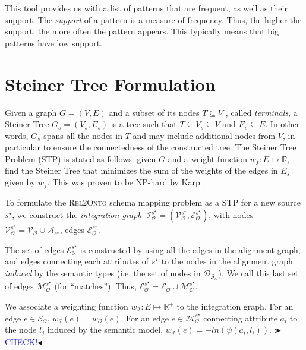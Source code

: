 \documentclass[letterpaper]{article} %
\newcommand{\authornote}[3]{
  {\fbox{\sc 
  #1}:$\blacktriangleright$\textcolor{#2}{\small{#3}}$\blacktriangleleft$}%
}
\newcommand{\ddg}[1]{\authornote{DDG}{blue}{#1}}
\newcommand{\relonto}{\textsc{Rel2Onto}}
\begin{document}
This tool provides us with a list of patterns that are frequent, as well as 
their support. 
The \emph{support} of a pattern is a measure of frequency. 
Thus, the higher the support, the more often the pattern appears. This typically means that big patterns have low support.

 

\section{Steiner Tree Formulation \label{SEC:STP}}

Given a graph $G =
(V, E)$ and a subset of its nodes $T \subseteq V$ , called \emph{terminals}, a 
Steiner Tree $G_s = (V_s, E_s )$ is a tree such that $T \subseteq V_s \subseteq 
V$ and $E_s \subseteq E$. In other words, $G_s$ spans all the nodes in $T$ and 
may include additional nodes from $V$, in particular to ensure the 
connectedness of the constructed tree. The Steiner Tree Problem 
(STP) is stated as follows: given $G$ and a weight function $w_f : E 
\mapsto \mathbb{R}$, find the Steiner Tree that minimizes the sum of the 
weights of the edges in $E_s$ given by $w_f$. This was proven to be NP-hard 
by Karp \cite{Karp1972}.

To formulate the \relonto{} schema mapping problem as a STP for a new source 
$s^\star$, we construct the 
\emph{integration graph} $~\mathcal{I}_\mathcal{O}^{s^\star} = 
(\mathcal{V}_\mathcal{O}^{s^\star},\mathcal{E}_\mathcal{O}^{s^\star})$, with 
nodes $\mathcal{V}_\mathcal{O}^{s^\star} = \mathcal{V_O} \cup 
\mathcal{A}_{s^\star}$, 
edges $\mathcal{E}_\mathcal{O}^{s^\star}$.

The set of edges $\mathcal{E}_\mathcal{O}^{s^\star}$ is constructed by using 
all the edges in the alignment 
graph, and edges connecting each attributes of $s^\star$ to the nodes in the 
alignment graph \emph{induced} by the semantic types (i.e. the set of nodes in 
$\mathcal{D_{G_O}}$). We call this last set 
of edges $\mathcal{M}_\mathcal{O}^{s^\star}$ (for ``matches''). Thus, 
$\mathcal{E}_\mathcal{O}^{s^\star} = 
\mathcal{E_O} \cup \mathcal{M}_\mathcal{O}^{s^\star}$.

We associate a weighting function  $w_\mathcal{I} : E \mapsto \mathbb{R}^+$ to 
the integration graph. For an edge $e \in \mathcal{E_O}$, $w_\mathcal{I}(e) = 
w_\mathcal{O}(e)$. For an edge $e 
\in \mathcal{M}_\mathcal{O}^{s^\star}$ connecting attribute $a_i$ to the node 
$l_j$ induced by the semantic model, $w_\mathcal{I}(e) = - 
ln(\psi(a_i,l_i))$. \ddg{CHECK!}
\end{document}
